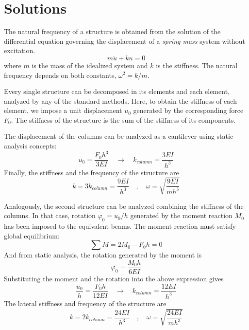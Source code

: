 \documentclass{problems}
\begin{document}
\begin{center}
\hspace{1em}
\end{center}




\newpage
\section{Solutions}


The natural frequency of a structure is obtained from the solution of the differential equation governing the displacement of a \emph{spring mass} system without excitation.
$$
m\ddot{u}+ku=0
$$
where $m$ is the mass of the idealized system and $k$ is the stiffness. The natural frequency depends on both constants, $\omega^2 = k/m$.

Every single structure can be decomposed in its elements and each element, analyzed by any of the standard methods. Here, to obtain the stiffness of each element, we impose a unit displacement $u_0$ generated by the corresponding force $F_0$. The stiffness of the structure is the sum of the stiffness of its components.

\begin{center}
\end{center}

The displacement of the columns can be analyzed as a cantilever using static analysis concepts:
$$
u_0 = \frac{F_0h^3}{3EI} \quad \rightarrow \quad k_{column} = \frac{3EI}{h^3}
$$
Finally, the stiffness and the frequency of the structure are
$$
k = 3k_{column} = \frac{9EI}{h^3} \quad , \quad \omega = \sqrt{\frac{9EI}{mh^3}}
$$

\begin{center}
\end{center}

Analogously, the second structure can be analyzed combining the stiffness of the columns. In that case, rotation $\varphi_0 = u_0/h$ generated by the moment reaction $M_0$ has been imposed to the equivalent beams. The moment reaction must satisfy global equilibrium:
$$
\sum M = 2M_0 -F_0h = 0
$$
And from static analysis, the rotation generated by the moment is
$$
\varphi_0 = \frac{M_0h}{6EI}
$$
Substituting the moment and the rotation into the above expression gives
$$
\frac{u_0}{h} = \frac{F_0h}{12EI} \quad \rightarrow \quad k_{column} = \frac{12EI}{h^3}
$$
The lateral stiffness and frequency of the structure are
$$
k = 2k_{column} = \frac{24EI}{h^3} \quad , \quad \omega = \sqrt{\frac{24EI}{mh^3}}
$$
\end{document}
